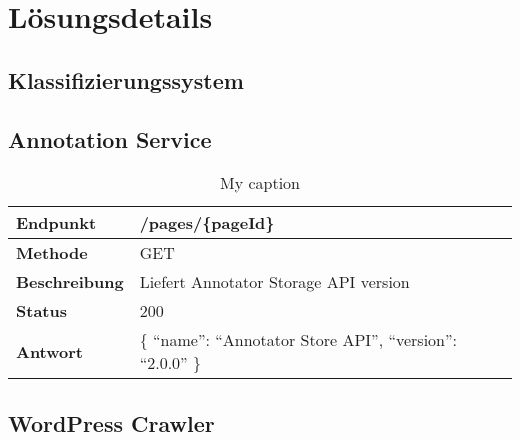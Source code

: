\chapter{Lösungsdetails}
    \label{chapter:SolutionDetails}


    \section{Klassifizierungssystem}


    \section{Annotation Service}
        \begin{table}[htb]
            \centering
            \begin{tabular}{|l|l|}
            \hline
            \textbf{Endpunkt}     & /pages/\{pageId\}                                       \\ \hline
            \textbf{Methode}      & GET                                                     \\ \hline
            \textbf{Beschreibung} & Liefert Annotator Storage API version                   \\ \hline
            \textbf{Status}       & 200                                                     \\ \hline
            \textbf{Antwort}      & \{ ``name'': ``Annotator Store API'', ``version'': ``2.0.0'' \} \\ \hline
            \end{tabular}
            \caption{My caption}
            \label{my-label}
        \end{table}

    \section{WordPress Crawler}